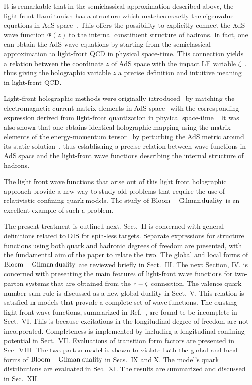 \documentclass[aps,prd,amsmath,longbibliography]{revtex4-1}
\def\BGs{\rm Bloom-Gilman\,duality}
\begin{document}
{It is remarkable that in the semiclassical approximation described above,  the light-front Hamiltonian  has a structure which matches exactly the eigenvalue equations in AdS space~\cite{Brodsky:2014yha}.  This offers the  possibility to explicitly connect  the AdS wave function $\Phi(z)$ to the internal constituent structure of hadrons. In fact, one can obtain the AdS wave equations by starting from the semiclassical approximation to light-front QCD in physical space-time.   This connection yields a  relation between the coordinate  $z$ of AdS space with the impact LF variable $\zeta$~\cite{deTeramond:2008ht},  thus giving  the holographic variable $z$ a precise definition and intuitive meaning in light-front QCD. 


Light-front  holographic methods  were originally introduced~\cite{Brodsky:2006uqa,Brodsky:2007hb} by matching the  electromagnetic current matrix elements in AdS space~\cite{Polchinski:2002jw} with the corresponding expression  derived from light-front  quantization in physical space-time~\cite{Drell:1969km,West:1970av}. It was also shown that one obtains  identical holographic mapping using the matrix elements of the energy-momentum tensor~\cite{Brodsky:2008pf} by perturbing the AdS metric  around its static solution~\cite{Abidin:2008ku}, thus establishing a precise relation between wave functions in AdS space and the light-front wave functions describing the internal structure of hadrons.

The light front wave functions that arise out of this light front holographic approach provide a new way to study old problems that require the  use of relativistic-confining quark models. The study of $\BGs$ is an excellent example of such a problem. 

The present treatment is outlined next. Sect.~II is concerned with general definitions related to DIS for spin-less targets. Separate expressions for structure functions using   both quark and hadronic degrees of freedom are presented, with the fundamental aim of the paper to relate the two.  The global and local forms of $\BGs$ are reviewed briefly in Sect.~III. The next Section, IV,  is concerned with presenting the main features of light-front wave functions for two-parton systems that are obtained from the $z-\zeta$ connection. The valence quark number sum rule is discussed as a new global duality in Sect.~V. This relation is satisfied in models that provide a complete set of wave functions.
The existing light front wave functions, summarized in Ref.~\cite{Brodsky:2014yha}, are found to be incomplete in Sect.~VI. This is because excitations in the longitudinal degree of freedom are not incorporated. Completeness is implemented by including a longitudinal confining potential  in Sect.~VII. Evaluations of transition form factors are presented in Sec.~VIII.  The two-parton  model 
is shown to violate both the global and local forms of $\BGs$  in Secs.~IX and X.  The model's quark distributions are evaluated in Sec.~XI. The results are summarized and discussed in Sec.~XII.







}
\end{document}
